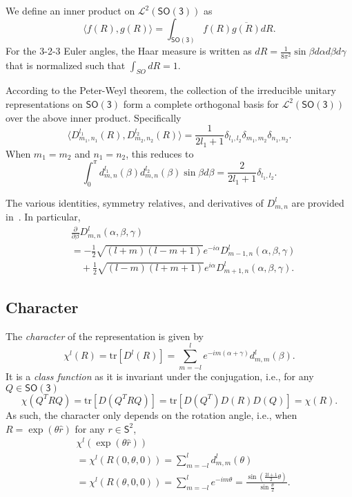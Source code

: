 \documentclass[onecolumn,11pt]{ieeetran}
\newcommand{\pair}[1]{\ensuremath{\langle #1 \rangle}}
\newcommand{\trs}[1]{\mathrm{tr}\ensuremath{[#1]}}
\newcommand{\deriv}[2]{\ensuremath{\frac{\partial #1}{\partial #2}}}
\newcommand{\SO}{\ensuremath{\mathsf{SO(3)}}}
\newcommand{\Sph}{\ensuremath{\mathsf{S}}}
\begin{document}
We define an inner product on $\mathcal{L}^2(\SO)$ as
\[
\pair{f(R),g(R)}=\int_{\SO} f(R) \overline{g(R)} dR.
\]
For the 3-2-3 Euler angles, the Haar measure is written as $dR = \frac{1}{8\pi^2}\sin\beta d\alpha d\beta d\gamma$ that is normalized such that $\int_{SO} dR = 1$. 

According to the Peter-Weyl theorem, the collection of the irreducible unitary representations on $\SO$ form a complete orthogonal basis for $\mathcal{L}^2(\SO)$ over the above inner product. Specifically
\begin{equation}
\pair{ D^{l_1}_{m_1,n_1}(R), D^{l_2}_{m_2,n_2}(R)} = \frac{1}{2l_1+1}\delta_{l_1,l_2}\delta_{m_1,m_2}\delta_{n_1,n_2}. \label{eqn:D_ortho}
\end{equation}
When $m_1=m_2$ and $n_1=n_2$, this reduces to
\[
\int_{0}^\pi d^{l_1}_{m,n}(\beta)d^{l_2}_{m,n}(\beta)\sin\beta d\beta = \frac{2}{2l_1+1}\delta_{l_1,l_2}. 
\]

The various identities, symmetry relatives, and derivatives of $D^{l}_{m,n}$ are provided in~\cite{VarMos88}. In particular,
\begin{align}
&\deriv{}{\beta} D^l_{m,n}(\alpha,\beta,\gamma)\nonumber\\
& = -\frac{1}{2}\sqrt{(l+m)(l-m+1)}e^{-i\alpha} D^l_{m-1,n}(\alpha,\beta,\gamma)\nonumber\\
& \quad + \frac{1}{2}\sqrt{(l-m)(l+m+1)}e^{i\alpha} D^l_{m+1,n}(\alpha,\beta,\gamma).\label{eqn:dD_dbeta}
\end{align}


\subsection{Character}

The \textit{character} of the representation is given by
\[
\chi^l(R) = \trs{D^l(R)}=\sum_{m=-l}^l e^{-im(\alpha+\gamma)} d^l_{m,m}(\beta).
\]
It is a \textit{class function} as it is invariant under the conjugation, i.e., for any $Q\in\SO$
\[
\chi(Q^T R Q) = \trs{D(Q^T R Q)}=\trs{D(Q^T)D(R)D(Q)}=\chi(R).
\]
As such, the character only depends on the rotation angle, i.e., when $R=\exp(\theta\hat r)$ for any $r\in\Sph^2$, 
\begin{align*}
&\chi^l(\exp(\theta\hat r))\\
&= \chi^l{(R(0,\theta,0))}= \sum_{m=-l}^l d^l_{m,m}(\theta)\\
&= \chi^l{(R(\theta,0,0))}= \sum_{m=-l}^l e^{-im\theta}
=\frac{\sin(\frac{2l+1}{2}\theta)}{\sin\frac{\theta}{2}}.
\end{align*}
\end{document}
